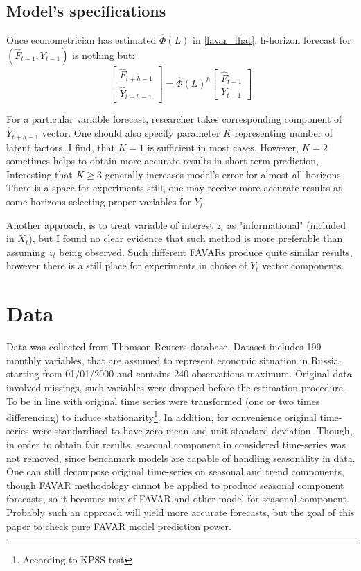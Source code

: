 \documentclass[a4paper, 14pt]{article}
\begin{document}
\subsection{Model's specifications}
Once econometrician has estimated $\hat\Phi(L)$ in \eqref{favar_fhat}, h-horizon forecast for $(\hat{F}_{t-1}, Y_{t-1})$ is nothing but:
\[\begin{bmatrix}
\hat{F}_{t+h-1} \\
\hat{Y}_{t+h-1}
\end{bmatrix} = \hat\Phi (L) ^{h}
\begin{bmatrix}
\hat{F}_{t-1} \\
Y_{t-1}
\end{bmatrix}\]

For a particular variable forecast, researcher takes corresponding component of $\hat{Y}_{t+h-1}$ vector. One should also specify parameter $K$ representing number of latent factors. I find, that $K=1$ is sufficient in most cases. However, $K=2$ sometimes helps to obtain more accurate results in short-term prediction, Interesting that $K\ge 3$ generally increases model's error for almost all horizons. There is a space for experiments still, one may receive more accurate results at some horizons selecting proper variables for $Y_t$.

Another approach, is to treat variable of interest $z_t$ as "informational" (included in $X_t$), but I found no clear evidence that such method is more preferable than assuming $z_t$ being observed. Such different FAVARs produce quite similar results, however there is a still place for experiments in choice of $Y_t$ vector components. 

\section{Data}

Data was collected from Thomson Reuters database. Dataset includes 199 monthly variables, that are assumed to represent economic situation in Russia, starting from 01/01/2000 and contains 240 observations maximum. Original data involved missings, such variables were dropped before the estimation procedure. To be in line with \cite{bernanke2005measuring} original time series were transformed (one or two times differencing) to induce stationarity\footnote{According to KPSS test}. In addition, for convenience original time-series were standardised to have zero mean and unit standard deviation. Though, in order to obtain fair results, seasonal component in considered time-series was not removed, since benchmark models are capable of handling seasonality in data. One can still decompose original time-series on seasonal and trend components, though FAVAR methodology cannot be applied to produce seasonal component forecasts, so it becomes mix of FAVAR and other model for seasonal component. Probably such an approach will yield more accurate forecasts, but the goal of this paper to check pure FAVAR model prediction power.
\end{document}
